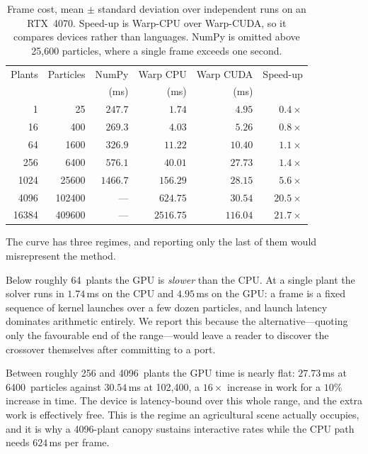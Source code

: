 \documentclass[conference]{IEEEtran}
\begin{document}
\begin{table}[t]
\caption{Frame cost, mean $\pm$ standard deviation over \BenchRepeats{}
independent runs on an RTX~4070. Speed-up is Warp-CPU over Warp-CUDA, so it
compares devices rather than languages. NumPy is omitted above 25{,}600
particles, where a single frame exceeds one second.}
\label{tab:benchmark}
\centering
\begin{tabular}{rrrrrr}
\toprule
Plants & Particles & NumPy & Warp CPU & Warp CUDA & Speed-up \\
       &           & (ms)  & (ms)     & (ms)      &          \\
\midrule
1     & 25      & $247.7$  & $1.74$    & $4.95$   & $0.4\times$ \\
16    & 400     & $269.3$  & $4.03$    & $5.26$   & $0.8\times$ \\
64    & 1600    & $326.9$  & $11.22$   & $10.40$  & $1.1\times$ \\
256   & 6400    & $576.1$  & $40.01$   & $27.73$  & $1.4\times$ \\
1024  & 25600   & $1466.7$ & $156.29$  & $28.15$  & $5.6\times$ \\
4096  & 102400  & ---      & $624.75$  & $30.54$  & $20.5\times$ \\
16384 & 409600  & ---      & $2516.75$ & $116.04$ & $21.7\times$ \\
\bottomrule
\end{tabular}
\end{table}

The curve has three regimes, and reporting only the last of them would
misrepresent the method.

Below roughly 64~plants the GPU is \emph{slower} than the CPU. At a single
plant the solver runs in $1.74$\,ms on the CPU and $4.95$\,ms on the GPU: a
frame is a fixed sequence of kernel launches over a few dozen particles, and
launch latency dominates arithmetic entirely. We report this because the
alternative---quoting only the favourable end of the range---would leave a
reader to discover the crossover themselves after committing to a port.

Between roughly 256 and 4096~plants the GPU time is nearly flat: $27.73$\,ms
at 6400~particles against $30.54$\,ms at 102{,}400, a $16\times$ increase in
work for a $10\%$ increase in time. The device is latency-bound over this
whole range, and the extra work is effectively free. This is the regime an
agricultural scene actually occupies, and it is why a 4096-plant canopy
sustains interactive rates while the CPU path needs $624$\,ms per frame.
\end{document}
